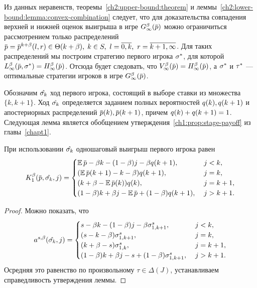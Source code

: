 {Из данных неравенств, теоремы~\ref{ch2:upper-bound:theorem} и леммы~\ref{ch2:lower-bound:lemma:convex-combination} следует, что для доказательства совпадения верхней и нижней оценок выигрыша в игре $\theG{\infty}(\pd)$ можно ограничиться рассмотрением только распределений %
$\pd = \pd^{k+\beta}(l, r) \in \Theta(k + \beta), \; k \in S,\ l = \overline{0, k},\ r = \overline{k+1, \infty}$.
Для таких распределений мы построим стратегию первого игрока $\sigma^*$, для которой $\L{\infty}(\pd, \sigmar^*) = \H{\infty}(\pd)$.
Отсюда будет следовать, что $\V{\infty}(\pd) = \H{\infty}(\pd)$, а $\sigma^*$ и $\tau^*$ --- оптимальные стратегии игроков в игре $\theG{\infty}(\pd)$.

Обозначим $\hat{\sigma_k}$ ход первого игрока, состоящий в выборе ставки из множества $\{k, k+1\}$.
Ход $\hat{\sigma_k}$ определяется заданием полных вероятностей $q(k), q(k+1)$ и апостериорных распределений $\pad{k}, \pad{k+1}$, причем $q(k) + q(k+1) = 1$.
Следующая лемма является обобщением утверждения~\ref{ch1:prop:stage-payoff} из главы~\ref{chapt1}.
\begin{lemma}
  \label{ch2:lower-bound:lemma:stage-payoff}
  При использовании $\hat{\sigma_k}$ одношаговый выигрыш первого игрока равен
  \begin{equation*}
    \K{1}(\pd, \sigmak, j) = \begin{cases}
      \E \pd - \beta k - (1-\beta) j - \beta \qc{k+1}, &\; j < k, \\
      (\E \pad{k+1} - k - \beta) \qc{k+1}, &\; j = k, \\
      (k + \beta - \E \pad{k}) \qc{k}, &\; j = k+1, \\
      (1-\beta) k + \beta j - \E \pd + (1-\beta) \qc{k+1}, &\; j > k + 1.
    \end{cases}
  \end{equation*}
\end{lemma}
\begin{proof}
  Можно показать, что
  \begin{equation*}
    \as(\sigmak, j) = \begin{cases}
      s - \beta k - (1-\beta) j - \beta \sigmasc[s]{k+1},     & \; j < k,   \\
      (s - k - \beta) \sigmasc[s]{k+1},                       & \; j = k,   \\
      (k + \beta - s) \sigmasc[s]{k},                           & \; j = k+1, \\
      (1-\beta) k + \beta j - s + (1-\beta) \sigmasc[s]{k+1}, & \; j > k + 1.
    \end{cases}
  \end{equation*}
  Осредняя это равенство по произвольному $\tau \in \Delta(J)$, устанавливаем справедливость утверждения леммы.
\end{proof}

}
